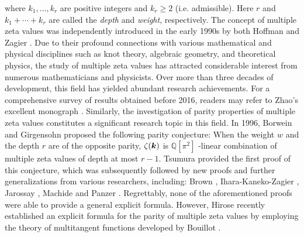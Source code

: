 \documentclass[11pt]{article}
\newcommand{\bfk}{{\boldsymbol{\sl{k}}}}
\def\Q{\mathbb{Q}}
\theoremstyle{plain}
\theoremstyle{definition}
\begin{document}
where $k_1,\ldots,k_r$ are positive integers and $k_r\geq 2$ (i.e. admissible). Here $r$ and $k_1+\cdots+k_r$ are called the \emph{depth} and \emph{weight}, respectively. The concept of multiple zeta values was independently introduced in the early 1990s by both Hoffman \cite{H1992} and Zagier \cite{DZ1994}. Due to their profound connections with various mathematical and physical disciplines such as knot theory, algebraic geometry, and theoretical physics, the study of multiple zeta values has attracted considerable interest from numerous mathematicians and physicists. Over more than three decades of development, this field has yielded abundant research achievements. For a comprehensive survey of results obtained before 2016, readers may refer to Zhao's excellent monograph \cite{Z2016}. Similarly, the investigation of parity properties of multiple zeta values constitutes a significant research topic in this field. In 1996, Borwein and Girgensohn \cite{Borwein-Girgensohn-1996} proposed the following parity conjecture: When the weight $w$ and the depth $r$ are of the opposite parity, $\zeta(\bfk)$ is $\Q[\pi^2]$ -linear combination of multiple zeta values of depth at most $r-1$. Tsumura \cite{Tsu-2004} provided the first proof of this conjecture, which was subsequently followed by new proofs and further generalizations from various researchers, including: Brown \cite{Brown2021}, Ihara-Kaneko-Zagier \cite{IKZ2006}, Jarossay \cite{Jarossay2020}, Machide \cite{Machide2016} and Panzer \cite{Panzer2017}. Regrettably, none of the aforementioned proofs were able to provide a general explicit formula. However, Hirose \cite{Hirose2025} recently established an explicit formula for the parity of multiple zeta values by employing the theory of multitangent functions developed by Bouillot \cite{Bouillot2014}.
\end{document}
